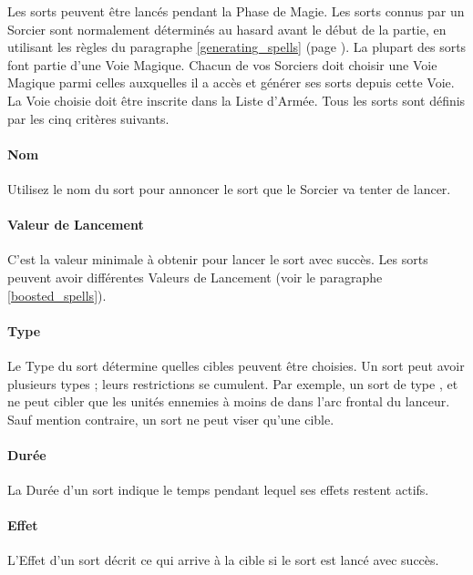Les sorts peuvent être lancés pendant la Phase de Magie. Les sorts connus par un Sorcier sont normalement déterminés au hasard avant le début de la partie, en utilisant les règles du paragraphe \ref{generating_spells} (page \pageref{generating_spells}). La plupart des sorts font partie d'une Voie Magique. Chacun de vos Sorciers doit choisir une Voie Magique parmi celles auxquelles il a accès et générer ses sorts depuis cette Voie. La Voie choisie doit être inscrite dans la Liste d'Armée. Tous les sorts sont définis par les cinq critères suivants.

\paragraph{Nom} 

Utilisez le nom du sort pour annoncer le sort que le Sorcier va tenter de lancer.

\paragraph{Valeur de Lancement} 

C'est la valeur minimale à obtenir pour lancer le sort avec succès. Les sorts peuvent avoir différentes Valeurs de Lancement (voir le paragraphe \ref{boosted_spells}).

\paragraph{Type}

Le Type du sort détermine quelles cibles peuvent être choisies. Un sort peut avoir plusieurs types ; leurs restrictions se cumulent. Par exemple, un sort de type , \hex{} et \direct{} ne peut cibler que les unités ennemies à moins de  dans l'arc frontal du lanceur. Sauf mention contraire, un sort ne peut viser qu'une cible.

\paragraph{Durée}

La Durée d'un sort indique le temps pendant lequel ses effets restent actifs.

\paragraph{Effet}

L'Effet d'un sort décrit ce qui arrive à la cible si le sort est lancé avec succès. 

